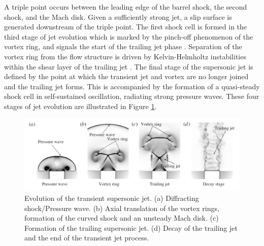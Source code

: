 A triple point occurs between the leading edge of the barrel shock, the second shock, and the Mach disk. Given a sufficiently strong jet, a slip surface is generated downstream of the triple point. The first shock cell is formed in the third stage of jet evolution which is marked by the pinch-off phenomenon of the vortex ring, and signals the start of the trailing jet phase \citep{gharib1998universal}. Separation of the vortex ring from the flow structure is driven by Kelvin-Helmholtz instabilities within the shear layer of the trailing jet \citep{zhao2000effects}. The final stage of the supersonic jet is defined by the point at which the transient jet and vortex are no longer joined and the trailing jet forms. This is accompanied by the formation of a quasi-steady shock cell in self-sustained oscillation, radiating strong pressure waves. These four stages of jet evolution are illustrated in Figure \ref{fig:2}.
\begin{figure}[h] 
	\centering
	\includegraphics[width=1\textwidth]{fig2.png} 
	\caption{Evolution of the transient supersonic jet. (a) Diffracting shock/Pressure
		wave. (b) Axial translation of the vortex rings, formation of the curved shock and an unsteady Mach disk. (c) Formation of the trailing supersonic jet. (d) Decay of the trailing jet and the end of the transient jet
		process. \citep{fernandez2017compressible}}
	\label{fig:2}
\end{figure}

